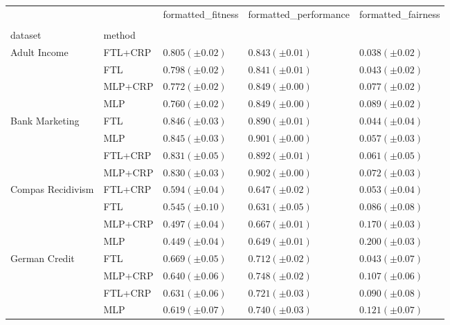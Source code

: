 \begin{tabular}{lllll}
\toprule
 &  & formatted_fitness & formatted_performance & formatted_fairness \\
 &  &  &  &  \\
dataset & method &  &  &  \\
\midrule
\multirow[t]{4}{*}{Adult Income} & FTL+CRP & $0.805 (\pm0.02)$ & $0.843 (\pm0.01)$ & $0.038 (\pm0.02)$ \\
 & FTL & $0.798 (\pm0.02)$ & $0.841 (\pm0.01)$ & $0.043 (\pm0.02)$ \\
 & MLP+CRP & $0.772 (\pm0.02)$ & $0.849 (\pm0.00)$ & $0.077 (\pm0.02)$ \\
 & MLP & $0.760 (\pm0.02)$ & $0.849 (\pm0.00)$ & $0.089 (\pm0.02)$ \\
\cline{1-5}
\multirow[t]{4}{*}{Bank Marketing} & FTL & $0.846 (\pm0.03)$ & $0.890 (\pm0.01)$ & $0.044 (\pm0.04)$ \\
 & MLP & $0.845 (\pm0.03)$ & $0.901 (\pm0.00)$ & $0.057 (\pm0.03)$ \\
 & FTL+CRP & $0.831 (\pm0.05)$ & $0.892 (\pm0.01)$ & $0.061 (\pm0.05)$ \\
 & MLP+CRP & $0.830 (\pm0.03)$ & $0.902 (\pm0.00)$ & $0.072 (\pm0.03)$ \\
\cline{1-5}
\multirow[t]{4}{*}{Compas Recidivism} & FTL+CRP & $0.594 (\pm0.04)$ & $0.647 (\pm0.02)$ & $0.053 (\pm0.04)$ \\
 & FTL & $0.545 (\pm0.10)$ & $0.631 (\pm0.05)$ & $0.086 (\pm0.08)$ \\
 & MLP+CRP & $0.497 (\pm0.04)$ & $0.667 (\pm0.01)$ & $0.170 (\pm0.03)$ \\
 & MLP & $0.449 (\pm0.04)$ & $0.649 (\pm0.01)$ & $0.200 (\pm0.03)$ \\
\cline{1-5}
\multirow[t]{4}{*}{German Credit} & FTL & $0.669 (\pm0.05)$ & $0.712 (\pm0.02)$ & $0.043 (\pm0.07)$ \\
 & MLP+CRP & $0.640 (\pm0.06)$ & $0.748 (\pm0.02)$ & $0.107 (\pm0.06)$ \\
 & FTL+CRP & $0.631 (\pm0.06)$ & $0.721 (\pm0.03)$ & $0.090 (\pm0.08)$ \\
 & MLP & $0.619 (\pm0.07)$ & $0.740 (\pm0.03)$ & $0.121 (\pm0.07)$ \\
\cline{1-5}
\bottomrule
\end{tabular}
